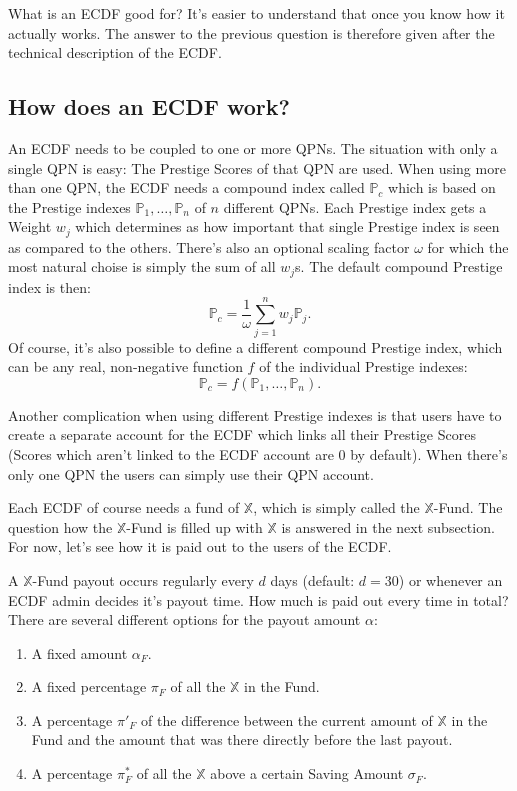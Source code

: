 \documentclass[a4paper,12pt]{scrartcl}
\begin{document}
What is an ECDF good for? It's easier to understand that once you know how it actually works. The answer to the previous question is therefore given after the technical description of the ECDF.

\subsection{How does an ECDF work?}
An ECDF needs to be coupled to one or more QPNs. The situation with only a single QPN is easy: The Prestige Scores of that QPN are used. When using more than one QPN, the ECDF needs a compound index called $\mathbb{P}_c$ which is based on the Prestige indexes $\mathbb{P}_1, \ldots ,\mathbb{P}_n$ of $n$ different QPNs. Each Prestige index gets a Weight $w_j$ which determines as how important that single Prestige index is seen as compared to the others. There's also an optional scaling factor $\omega$ for which the most natural choise is simply the sum of all $w_j$s. The default compound Prestige index is then:
$$\mathbb{P}_c = \frac{1}{\omega} \sum_{j=1}^{n} w_j \mathbb{P}_j.$$
Of course, it's also possible to define a different compound Prestige index, which can be any real, non-negative function $f$ of the individual Prestige indexes:
$$\mathbb{P}_c = f(\mathbb{P}_1,\ldots,\mathbb{P}_n).$$

Another complication when using different Prestige indexes is that users have to create a separate account for the ECDF which links all their Prestige Scores (Scores which aren't linked to the ECDF account are $0$ by default). When there's only one QPN the users can simply use their QPN account.

Each ECDF of course needs a fund of $\mathbb{X}$, which is simply called the $\mathbb{X}$-Fund. The question how the $\mathbb{X}$-Fund is filled up with $\mathbb{X}$ is answered in the next subsection. For now, let's see how it is paid out to the users of the ECDF.

A $\mathbb{X}$-Fund payout occurs regularly every $d$ days (default: $d = 30$) or whenever an ECDF admin decides it's payout time. How much is paid out every time in total? There are several different options for the payout amount $\alpha$:

\begin{enumerate}
 \item A fixed amount $\alpha_F$.
 \item A fixed percentage $\pi_F$ of all the $\mathbb{X}$ in the Fund.
 \item A percentage $\pi'_F$ of the difference between the current amount of $\mathbb{X}$ in the Fund and the amount that was there directly before the last payout.
 \item A percentage $\pi^*_F$ of all the $\mathbb{X}$ above a certain Saving Amount $\sigma_F$.
\end{enumerate}
\end{document}
